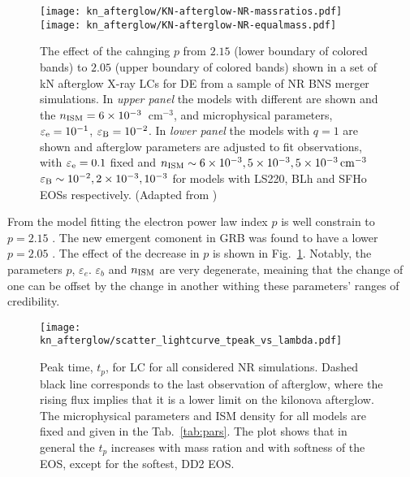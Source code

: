 \begin{figure}
    \begin{center}
    \texttt{[image: kn\_afterglow/KN-afterglow-NR-massratios.pdf]}
    \texttt{[image: kn\_afterglow/KN-afterglow-NR-equalmass.pdf]}
    \caption{
        The effect of the cahnging $p$ from $2.15$ (lower boundary of colored bands) to 
        $2.05$ (upper boundary of colored bands) shown in a set of \ac{kN} afterglow 
        X-ray \acp{LC} for \ac{DE} from a sample of \ac{NR} \ac{BNS} merger simulations.
        In \emph{upper panel} the models with different \mr{} are shown and the 
        $n_{\text{ISM}}=6\times10^{-3}$~cm$^{-3}$, and microphysical parameters, 
        $\varepsilon_{\rm e}=10^{-1}$, $\varepsilon_{\rm B}=10^{-2}$.
        In \emph{lower panel} the models with $q=1$ are shown and afterglow
        parameters are adjusted to fit observations, 
        with $\varepsilon_{\rm e}=0.1$ fixed and  
        $n_{\text{ISM}}\sim 6\times 10^{-3}, 5\times 10^{-3},5\times 10^{-3}\,\rm{cm^{-3}}$
        $\varepsilon_{\rm B}\sim 10^{-2},2\times 10^{-3},10^{-3}$ for models with 
        LS220, BLh and SFHo \acp{EOS} respectively.
        (Adapted from \citet{Hajela:2021faz})
    }
    \end{center}
    \label{fig:kn_afterglow}
\end{figure}

From the \GRB{} model fitting the electron power law index $p$ is well constrain to $p=2.15$
\citep[\eg][]{Hajela:2019mjy}. The new emergent comonent in \ac{GRB} was found to have a lower 
$p=2.05$ \citep{Hajela:2021faz}. The effect of the decrease in $p$ is shown in 
Fig.~\ref{fig:kn_afterglow}. Notably, the parameters $p$, $\varepsilon_e$. $\varepsilon_b$ and 
$n_{\text{ISM}}$ are very degenerate, meaining that the change of one can be offset by the change in 
another withing these parameters' ranges of credibility. 

\begin{figure}%
    \centering 
    \texttt{[image: kn\_afterglow/scatter\_lightcurve\_tpeak\_vs\_lambda.pdf]}
    \caption{
        Peak time, $t_p$, for \ac{LC} for all considered \ac{NR} simulations. 
        Dashed black line corresponds to the last observation of \GRB{} afterglow,
        where the rising flux implies that it is a lower limit on the kilonova 
        afterglow.
        The microphysical parameters and \ac{ISM} density for all models are fixed and 
        given in the Tab.~\ref{tab:pars}.
        The plot shows that in general the $t_p$ increases with mass ration and with 
        softness of the \ac{EOS}, except for the softest, DD2 \ac{EOS}. 
    } 
    \label{fig:lightcurve_peaks}
\end{figure}

